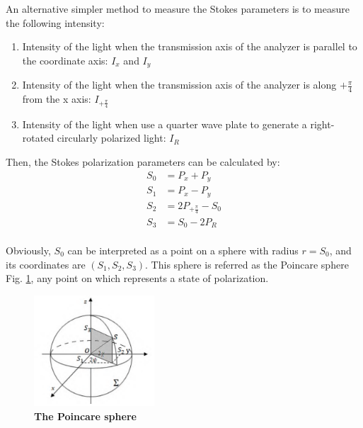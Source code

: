 \documentclass[10pt,a4paper,twocolumn,twoside,UTF8]{article}
\begin{document}
		An alternative simpler method to measure the Stokes parameters is to measure the following intensity:
		\begin{enumerate}[label=\arabic*.]
			\item Intensity of the light when the transmission axis of the analyzer is parallel to the coordinate axis: $I_x$ and $I_y$
			\item Intensity of the light when the transmission axis of the analyzer is along $+ \frac{\pi}{4}$ from the x axis: $I_{+\frac{\pi}{4}}$ 
			\item Intensity of the light when use a quarter wave plate to generate a right-rotated circularly polarized light: $I_R$
		\end{enumerate}
		Then, the Stokes polarization parameters can be calculated by:
		\begin{align}
			S_0 &= P_x + P_y  \label{eq.4.5.1}\\
			S_1 &= P_x - P_y  \label{eq.4.5.2}\\
			S_2 &= 2P_{+\frac{\pi}{4}} - S_0  \label{eq.4.5.3}\\
			S_3 &= S_0 - 2P_R  \label{eq.4.5.4}\\
		\end{align}

		Obviously, $S_0$ can be interpreted as a point on a sphere with radius $r=S_0$, and its coordinates are $(S_1, S_2, S_3)$. 
		This sphere is referred as the Poincare sphere Fig. \ref{fig.illus-3.1}, any point on which represents a state of polarization.
		\begin{figure}[htbp]
			\centering
			\includegraphics[width=0.4\textwidth]{attachments/illus-3.1.png}
			\caption{\textbf{The Poincare sphere}}
			\label{fig.illus-3.1}
		\end{figure}
\end{document}
